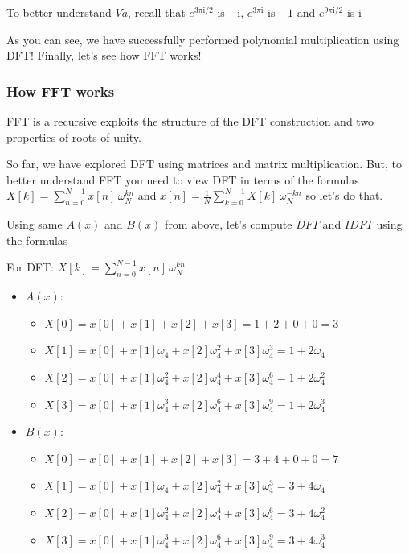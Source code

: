 \documentclass[11pt]{article}
\providecommand{\tightlist}{%
      \setlength{\itemsep}{0pt}\setlength{\parskip}{0pt}}
\begin{document}
    To better understand \(Va\), recall that \(e^{{3\pi\mathrm{i}}/2}\) is
\(-\mathrm{i}\), \(e^{3\pi\mathrm{i}}\) is \(-1\) and
\(e^{{9\pi\mathrm{i}}/2}\) is \(\mathrm{i}\)

As you can see, we have successfully performed polynomial multiplication
using DFT! Finally, let's see how FFT works!

    \subsubsection{How FFT works}\label{how-fft-works}

    FFT is a recursive exploits the structure of the DFT construction and
two properties of roots of unity.

So far, we have explored DFT using matrices and matrix multiplication.
But, to better understand FFT you need to view DFT in terms of the
formulas \(X[k] = \sum_{n=0}^{N-1} x[n]\, \omega_N^{kn}\) and
\(x[n] = \frac{1}{N} \sum_{k=0}^{N-1} X[k]\, \omega_N^{-kn}\) so let's
do that.

Using same \(A(x)\) and \(B(x)\) from above, let's compute \(DFT\) and
\(IDFT\) using the formulas

For DFT: \(X[k] = \sum_{n=0}^{N-1} x[n]\, \omega_N^{kn}\)

\begin{itemize}
\item
  \(A(x)\):

  \begin{itemize}
  \tightlist
  \item
    \(X[0] = x[0] + x[1] + x[2] + x[3] = 1 + 2 + 0 + 0 = 3\)
  \item
    \(X[1] = x[0] + x[1]\omega_4 + x[2]\omega_4^{2} + x[3]\omega_4^{3} = 1 + 2\omega_4\)
  \item
    \(X[2] = x[0] + x[1]\omega_4^{2} + x[2]\omega_4^{4} + x[3]\omega_4^{6} = 1 + 2\omega_4^2\)
  \item
    \(X[3] = x[0] + x[1]\omega_4^{3} + x[2]\omega_4^{6} + x[3]\omega_4^{9} = 1 + 2\omega_4^3\)
  \end{itemize}
\item
  \(B(x)\):

  \begin{itemize}
  \tightlist
  \item
    \(X[0] = x[0] + x[1] + x[2] + x[3] = 3 + 4 + 0 + 0 = 7\)
  \item
    \(X[1] = x[0] + x[1]\omega_4 + x[2]\omega_4^{2} + x[3]\omega_4^{3} = 3 + 4\omega_4\)
  \item
    \(X[2] = x[0] + x[1]\omega_4^{2} + x[2]\omega_4^{4} + x[3]\omega_4^{6} = 3 + 4\omega_4^2\)
  \item
    \(X[3] = x[0] + x[1]\omega_4^{3} + x[2]\omega_4^{6} + x[3]\omega_4^{9} = 3 + 4\omega_4^3\)
  \end{itemize}
\end{itemize}
\end{document}
